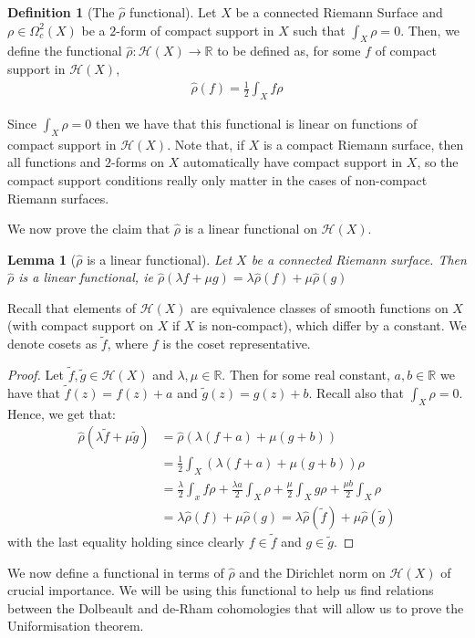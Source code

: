 \documentclass[11pt]{report}
\newtheorem{lemma}[thm]{Lemma}
\theoremstyle{definition}
\newtheorem{defn}[thm]{Definition}
\begin{document}
\begin{defn}[The $\hat{\rho}$ functional]
  Let $X$ be a connected Riemann Surface and $\rho \in \Omega^2_c(X)$ be a $2$-form of compact support in $X$ such that $\int_X \rho = 0$. Then, we define the functional $\hat{\rho} \colon \mathcal{H}(X) \rightarrow \mathbb{R}$ to be defined as, for some $f$ of compact support in $\mathcal{H}(X)$,
  \begin{align*}
    \hat{\rho}(f) = \frac{1}{2}\int_X f\rho
  \end{align*}
\end{defn}

Since $\int_X \rho = 0$ then we have that this functional is linear on functions of compact support in $\mathcal{H}(X)$. Note that, if $X$ is a compact Riemann surface, then all functions and $2$-forms on $X$ automatically have compact support in $X$, so the compact support conditions really only matter in the cases of non-compact Riemann surfaces.

We now prove the claim that $\hat{\rho}$ is a linear functional on $\mathcal{H}(X)$.
\begin{lemma}[$\hat{\rho}$ is a linear functional]\label{rhohatlinear}
  Let $X$ be a connected Riemann surface. Then $\hat{\rho}$ is a linear functional, ie $\hat{\rho}(\lambda f+ \mu g) = \lambda \hat{\rho}(f) + \mu \hat{\rho}(g)$
\end{lemma}
Recall that elements of $\mathcal{H}(X)$ are equivalence classes of smooth functions on $X$ (with compact support on $X$ if $X$ is non-compact), which differ by a constant. We denote cosets as $\tilde{f}$, where $f$ is the coset representative.
\begin{proof}
  Let $\tilde{f},\tilde{g} \in \mathcal{H}(X)$ and $\lambda,\mu \in \mathbb{R}$. Then for some real constant, $a,b \in \mathbb{R}$ we have that $\tilde{f}(z) = f(z) + a$ and $\tilde{g}(z) = g(z) + b$. Recall also that $\int_X \rho = 0$.
  Hence, we get that:
  \begin{align*}
    \hat{\rho}(\lambda \tilde{f}+ \mu \tilde{g}) &= \hat{\rho}(\lambda(f + a) + \mu(g + b)) \\
    &=\frac{1}{2}\int_X (\lambda(f + a) + \mu(g + b))\rho \\
    &=\frac{\lambda}{2} \int_x f\rho + \frac{\lambda a}{2}\int_X \rho + \frac{\mu}{2} \int_X g\rho + \frac{\mu b}{2}\int_X \rho \\
    &=\lambda \hat{\rho}(f) + \mu \hat{\rho}(g)=\lambda \hat{\rho}(\tilde{f}) + \mu \hat{\rho}(\tilde{g})
  \end{align*}
  with the last equality holding since clearly $f \in \tilde{f}$ and $g \in \tilde{g}$.
\end{proof}
We now define a functional in terms of $\hat{\rho}$ and the Dirichlet norm on $\mathcal{H}(X)$ of crucial importance. We will be using this functional to help us find relations between the Dolbeault and de-Rham cohomologies that will allow us to prove the Uniformisation theorem. 
\end{document}
